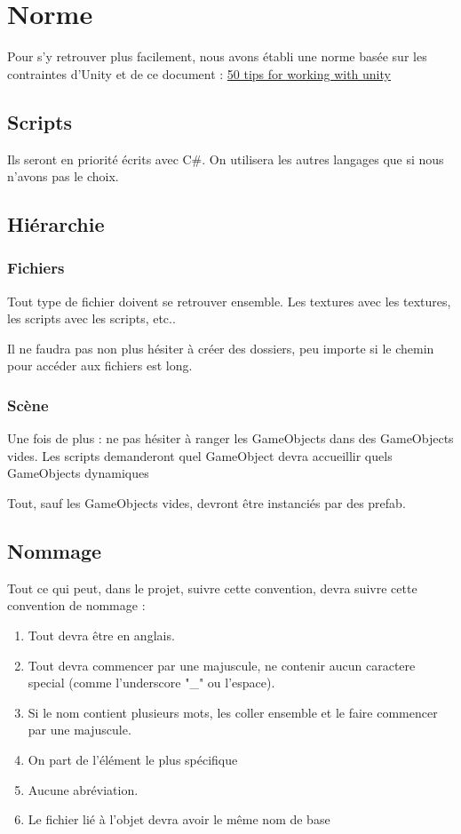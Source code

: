 \section{Norme}
Pour s'y retrouver plus facilement, nous avons établi une norme basée sur les contraintes d'Unity et de ce document : \href{http://devmag.org.za/2012/07/12/50-tips-for-working-with-unity-best-practices/}{50 tips for working with unity}

\subsection{Scripts}

Ils seront en priorité écrits avec C\#.
On utilisera les autres langages que si nous n'avons pas le choix.

\subsection{Hiérarchie}
\subsubsection{Fichiers}

Tout type de fichier doivent se retrouver ensemble.
Les textures avec les textures, les scripts avec les scripts, etc..

Il ne faudra pas non plus hésiter à créer des dossiers, peu importe si le chemin pour accéder aux fichiers est long.

\subsubsection{Scène}

Une fois de plus : ne pas hésiter à ranger les GameObjects dans des GameObjects vides.
Les scripts demanderont quel GameObject devra accueillir quels GameObjects dynamiques

Tout, sauf les GameObjects vides, devront être instanciés par des prefab.

\subsection{Nommage}
Tout ce qui peut, dans le projet, suivre cette convention, devra suivre cette convention de nommage :

\begin{enumerate}
\item Tout devra être en anglais.
\item Tout devra commencer par une majuscule, ne contenir aucun caractere special (comme l'underscore "\_" ou l'espace).
\item Si le nom contient plusieurs mots, les coller ensemble et le faire commencer par une majuscule.
\item On part de l'élément le plus spécifique
\item Aucune abréviation.
\item Le fichier lié à l'objet devra avoir le même nom de base
\end{enumerate}

